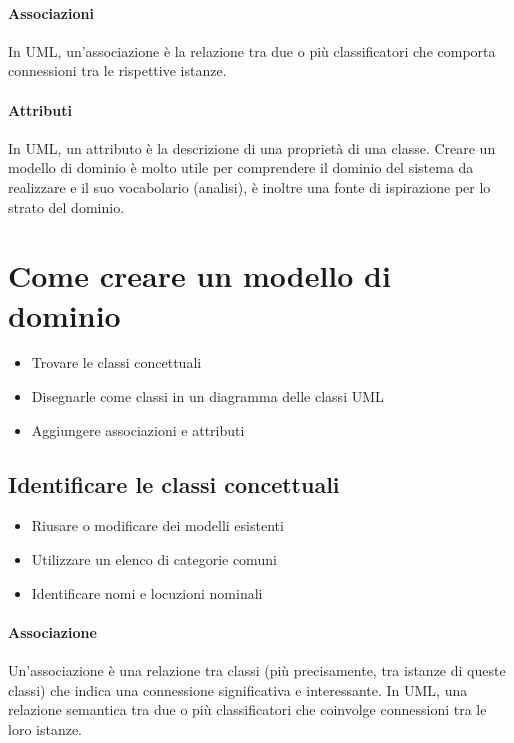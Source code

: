 \paragraph*{Associazioni} In UML, un'associazione è la relazione tra due o più
classificatori che comporta connessioni tra le rispettive istanze.
\paragraph*{Attributi} In UML, un attributo è la descrizione di una proprietà
di una classe.
Creare un modello di dominio è molto utile per comprendere il dominio del sistema da
realizzare e il suo vocabolario (analisi), è inoltre una fonte di ispirazione per lo strato
del dominio.
\section{Come creare un modello di dominio}
\begin{itemize}
    \item Trovare le classi concettuali
    \item Disegnarle come classi in un diagramma delle classi UML
    \item Aggiungere associazioni e attributi
\end{itemize}
\subsection*{Identificare le classi concettuali}
\begin{itemize}
    \item Riusare o modificare dei modelli esistenti
    \item Utilizzare un elenco di categorie comuni
    \item Identificare nomi e locuzioni nominali
\end{itemize}
\paragraph*{Associazione}
Un'associazione è una relazione tra classi (più precisamente, tra istanze di
queste classi) che indica una connessione significativa e interessante.
In UML, una relazione semantica tra due o più classificatori che coinvolge
connessioni tra le loro istanze.
